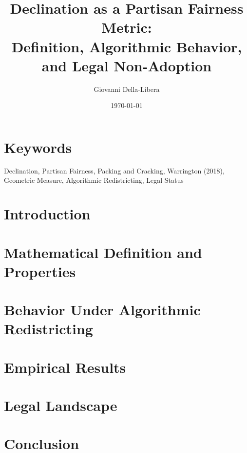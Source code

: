\documentclass[12pt]{article}
\title{\textbf{Declination as a Partisan Fairness Metric:\\
Definition, Algorithmic Behavior, and Legal Non-Adoption}}
\author{Giovanni Della-Libera}
\date{\today}
\begin{document}
\maketitle

\begin{abstract}

\end{abstract}

\section*{Keywords}
Declination, Partisan Fairness, Packing and Cracking, Warrington (2018), Geometric
Measure, Algorithmic Redistricting, Legal Status

\section{Introduction}


\section{Mathematical Definition and Properties}


\section{Behavior Under Algorithmic Redistricting}


\section{Empirical Results}


\section{Legal Landscape}


\section{Conclusion}




\end{document}
